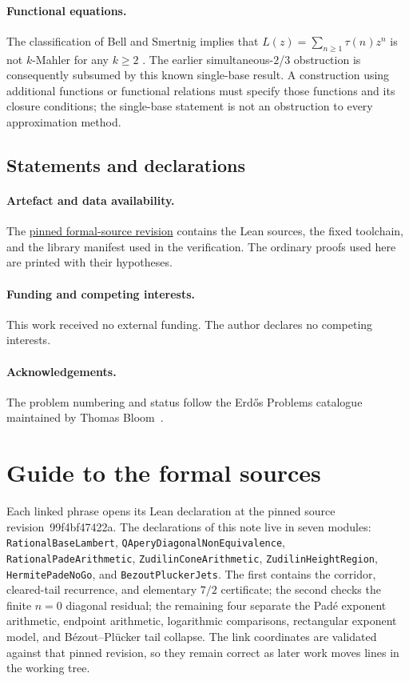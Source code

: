 \documentclass[11pt]{article}
\renewcommand{\commitshort}{99f4bf47422a}
\begin{document}
\paragraph{Functional equations.}
The classification of Bell and Smertnig implies that
$L(z)=\sum_{n\ge1}\tau(n)z^n$ is not $k$-Mahler for any $k\ge2$
\cite[Introduction]{bellsmertnig2026}.
The earlier simultaneous-$2$/$3$ obstruction is consequently subsumed by
this known single-base result.  A construction using additional functions or
functional relations must specify those functions and its closure conditions;
the single-base statement is not an obstruction to every approximation method.

\subsection*{Statements and declarations}

\paragraph{Artefact and data availability.} The
\href{\sourceurl}{pinned formal-source revision} contains the Lean sources, the
fixed toolchain, and the library manifest used in the verification.  The ordinary proofs used here are printed with their hypotheses.

\paragraph{Funding and competing interests.} This work received no external
funding.  The author declares no competing interests.

\paragraph{Acknowledgements.} The problem numbering and status follow the
Erd\H{o}s Problems catalogue maintained by Thomas Bloom~\cite{erdosproblems}.


\appendix
\section{Guide to the formal sources}\label{app:index}

Each linked phrase opens its Lean declaration at the pinned source
revision~\commitshort.  The declarations of this note live in seven modules:
\texttt{RationalBaseLambert}, \texttt{QAperyDiagonalNonEquivalence},
\texttt{RationalPadeArithmetic}, \texttt{ZudilinConeArithmetic},
\texttt{ZudilinHeightRegion}, \texttt{HermitePadeNoGo}, and
\texttt{BezoutPluckerJets}.  The first contains
the corridor, cleared-tail recurrence, and elementary $7/2$ certificate; the
second checks the finite $n=0$ diagonal residual; the remaining four separate
the Pad\'e exponent arithmetic, endpoint arithmetic, logarithmic comparisons,
rectangular exponent model, and B\'ezout--Pl\"ucker tail collapse.  The link
coordinates are validated against that pinned revision, so they remain correct
as later work moves lines in the working tree.
\end{document}
